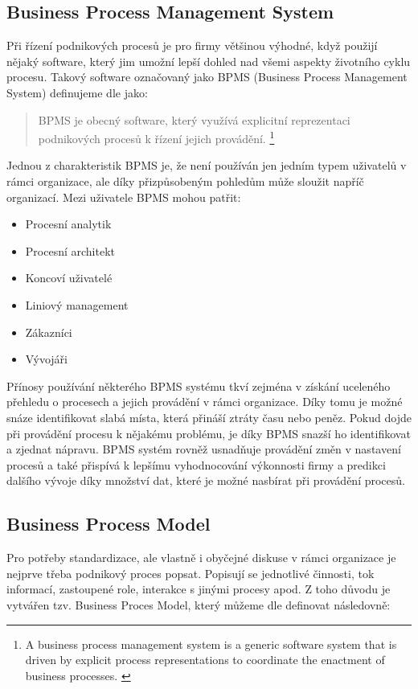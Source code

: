 \documentclass[]{article}
\begin{document}
\subsection{Business Process Management System}
Při řízení podnikových procesů je pro firmy většinou výhodné, když použijí nějaký software, který jim umožní lepší dohled nad všemi aspekty životního cyklu procesu. Takový software označovaný jako BPMS (Business Process Management System) definujeme dle \cite{Weske2007} jako:

\begin{quote}
BPMS je obecný software, který využívá explicitní reprezentaci podnikových procesů k řízení jejich provádění.
\footnote{A business process management system is a generic software system that is driven by explicit process representations to coordinate the enactment of business processes. \cite{Weske2007}}
\end{quote}

Jednou z charakteristik BPMS je, že není používán jen jedním typem uživatelů v rámci organizace, ale díky přizpůsobeným pohledům může sloužit napříč organizací. Mezi uživatele BPMS mohou patřit: \cite{Naplava2015}

\begin{itemize}
\item Procesní analytik
\item Procesní architekt
\item Koncoví uživatelé
\item Liniový management
\item Zákazníci
\item Vývojáři
\end{itemize}

Přínosy používání některého BPMS systému tkví zejména v získání uceleného přehledu o procesech a jejich provádění v rámci organizace. Díky tomu je možné snáze identifikovat slabá místa, která přináší ztráty času nebo peněz. Pokud dojde při provádění procesu k nějakému problému, je díky BPMS snazší ho identifikovat a zjednat nápravu. BPMS systém rovněž usnadňuje provádění změn v nastavení procesů a také přispívá k lepšímu vyhodnocování výkonnosti firmy a predikci dalšího vývoje díky množství dat, které je možné nasbírat při provádění procesů.

\subsection{Business Process Model}
Pro potřeby standardizace, ale vlastně i obyčejné diskuse v rámci organizace je nejprve třeba podnikový proces popsat. Popisují se jednotlivé činnosti, tok informací, zastoupené role, interakce s jinými procesy apod. Z toho důvodu je vytvářen tzv. Business Proces Model, který můžeme dle \cite{Weske2007} definovat následovně:
\end{document}
